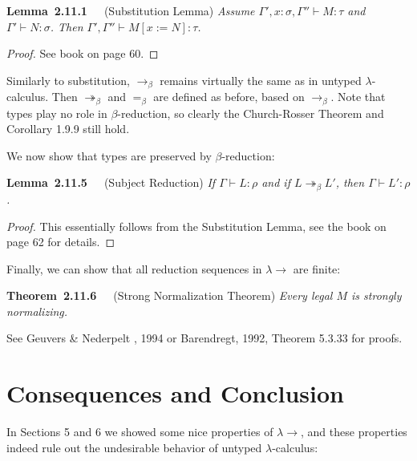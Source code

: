 \documentclass[letterpaper]{article}
\newenvironment{theorem}[2][]{\par\medskip
	\noindent \textbf{Theorem~#2}~~~#1 \rmfamily\em}{\medskip}
\newenvironment{lemma}[2][]{\par\medskip
	\noindent \textbf{Lemma~#2}~~~#1 \rmfamily\em}{\medskip}
\renewcommand{\l}{\lambda}
\newcommand{\beq}{=_\beta}
\newcommand{\betaro}{\rightarrow_\beta}
\newcommand{\betar}{\twoheadrightarrow_\beta}
\newcommand{\larr}{\lambda \!\! \rightarrow}
\begin{document}
\begin{lemma}[(Substitution Lemma)]{2.11.1}
	Assume $\Gamma', x : \sigma, \Gamma'' \vdash M : \tau$ and $\Gamma' \vdash N : \sigma$. Then $\Gamma', \Gamma'' \vdash M[x := N] : \tau$.
\end{lemma}

\begin{proof}
	See book on page 60.
\end{proof}

Similarly to substitution, $\betaro$ remains virtually the same as in untyped $\l$-calculus. Then $\betar$ and $\beq$ are defined as before, based on $\betaro$. Note that types play no role in $\beta$-reduction, so clearly the Church-Rosser Theorem and Corollary 1.9.9 still hold.

We now show that types are preserved by $\beta$-reduction:

\begin{lemma}[(Subject Reduction)]{2.11.5}
	If $\Gamma \vdash L : \rho$ and if $L \betar L'$, then $\Gamma \vdash L' : \rho$.
\end{lemma}

\begin{proof}
	This essentially follows from the Substitution Lemma, see the book on page 62 for details.
\end{proof}

Finally, we can show that all reduction sequences in $\larr$ are finite:

\begin{theorem}[(Strong Normalization Theorem)]{2.11.6}
	Every legal $M$ is strongly normalizing.
\end{theorem}

See Geuvers \& Nederpelt , 1994 or Barendregt, 1992, Theorem 5.3.33 for proofs.


\section{Consequences and Conclusion}

In Sections 5 and 6 we showed some nice properties of $\larr$, and these properties indeed rule out the undesirable behavior of untyped $\l$-calculus:
\end{document}
